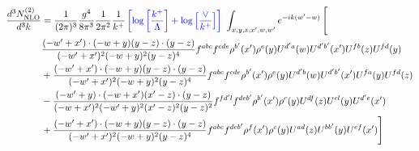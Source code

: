 \documentclass[aps,prd,amsmath,amssymb,nofootinbib]{revtex4-2}
\numberwithin{equation}{section}
\begin{document}
\begin{align}
    \frac{d^{3}N^{(2)}_{\rm NLO}}{d^{3}k} & = \frac{1}{(2\pi)^{3}}\frac{g^{4}}{8\pi^{3}}\frac{1}{2\pi^{2}} \frac{1}{k^{+}}\,{\color{blue}\left[\log{\left[\frac{k^{+}}{\Lambda}\right]}+\log{\left[\frac{\vee}{k^{+}}\right]}\right]}\,\,\int_{x,y,z,x^{\prime},w,w^{\prime}}e^{-ik(w^{\prime}-w)}\, \Bigg[\notag \\ &  \frac{( - w' + x') \cdot ( - w + y) (y - z) \cdot (y - z)}{( - w' + x')^{2} ( - w + y)^{2} (y - z)^{4}} f^{a b c} f^{c d e} \rho^{b'}(x') \rho^{e}(y) U^{d' a}(w) U^{d' b'}(x') U^{f b}(z) U^{f d}(y)\nonumber\\
        &+ \frac{( - w' + x') \cdot ( - w + y) (y - z) \cdot (y - z)}{( - w' + x')^{2} ( - w + y)^{2} (y - z)^{4}} f^{a b c} f^{c d e} \rho^{b'}(x') \rho^{e}(y) U^{d' b}(w) U^{d' b'}(x') U^{f a}(y) U^{f d}(z)\nonumber\\
    &- \frac{( - w' + y) \cdot ( - w + x') (x' - z) \cdot (y - z)}{( - w + x')^{2} ( - w' + y)^{2} (x' - z)^{2} (y - z)^{2}} f^{f d' l} f^{d e b'} \rho^{b'}(x') \rho^{c}(y) U^{d f}(z) U^{c l}(y) U^{d' e}(x')\nonumber\\
    & + \frac{( - w' + x') \cdot ( - w + y) (y - z) \cdot (y - z)}{( - w' + x')^{2} ( - w + y)^{2} (y - z)^{4}} f^{a b c} f^{d e b'} \rho^{f}(x') \rho^{c}(y) U^{a d}(z) U^{b b'}(y) U^{e f}(x')\Bigg]
\end{align}
\end{document}

